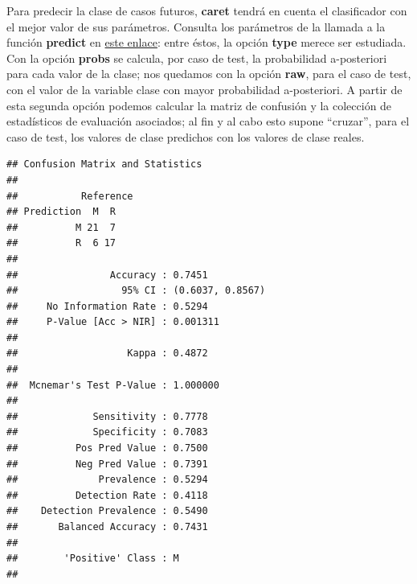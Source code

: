 \documentclass[
]{article}
\newenvironment{Shaded}{\begin{snugshade}}{\end{snugshade}}
\newcommand{\DataTypeTok}[1]{\textcolor[rgb]{0.13,0.29,0.53}{#1}}
\newcommand{\KeywordTok}[1]{\textcolor[rgb]{0.13,0.29,0.53}{\textbf{#1}}}
\newcommand{\NormalTok}[1]{#1}
\newcommand{\OperatorTok}[1]{\textcolor[rgb]{0.81,0.36,0.00}{\textbf{#1}}}
\newcommand{\StringTok}[1]{\textcolor[rgb]{0.31,0.60,0.02}{#1}}
\begin{document}
Para predecir la clase de casos futuros, \textbf{caret} tendrá en cuenta
el clasificador con el mejor valor de sus parámetros. Consulta los
parámetros de la llamada a la función \textbf{predict} en
\href{https://www.rdocumentation.org/packages/caret/versions/6.0-72/topics/extractPrediction}{este
enlace}: entre éstos, la opción \textbf{type} merece ser estudiada. Con
la opción \textbf{probs} se calcula, por caso de test, la probabilidad
a-posteriori para cada valor de la clase; nos quedamos con la opción
\textbf{raw}, para el caso de test, con el valor de la variable clase
con mayor probabilidad a-posteriori. A partir de esta segunda opción
podemos calcular la matriz de confusión y la colección de estadísticos
de evaluación asociados; al fin y al cabo esto supone ``cruzar'', para
el caso de test, los valores de clase predichos con los valores de clase
reales.

\begin{Shaded}
\end{Shaded}

\begin{verbatim}
## Confusion Matrix and Statistics
## 
##           Reference
## Prediction  M  R
##          M 21  7
##          R  6 17
##                                           
##                Accuracy : 0.7451          
##                  95% CI : (0.6037, 0.8567)
##     No Information Rate : 0.5294          
##     P-Value [Acc > NIR] : 0.001311        
##                                           
##                   Kappa : 0.4872          
##                                           
##  Mcnemar's Test P-Value : 1.000000        
##                                           
##             Sensitivity : 0.7778          
##             Specificity : 0.7083          
##          Pos Pred Value : 0.7500          
##          Neg Pred Value : 0.7391          
##              Prevalence : 0.5294          
##          Detection Rate : 0.4118          
##    Detection Prevalence : 0.5490          
##       Balanced Accuracy : 0.7431          
##                                           
##        'Positive' Class : M               
## 
\end{verbatim}
\end{document}
